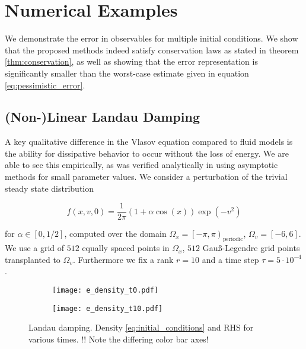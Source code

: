 
\section{Numerical Examples}

We demonstrate the error in observables for multiple initial conditions. We show that 
the proposed methods indeed satisfy conservation laws as stated in theorem 
\ref{thm:conservation}, as well as showing that the error representation is significantly 
smaller than the worst-case estimate given in equation \ref{eq:pessimistic_error}. 

\subsection{(Non-)Linear Landau Damping}\label{sec:landau}

A key qualitative difference in the Vlasov equation compared to fluid models is the 
ability for dissipative behavior to occur without the loss of energy. We are able to 
see this empirically, as was verified analytically in \cite{landau} using asymptotic 
methods for small parameter values. We consider a perturbation of the trivial steady 
state distribution 

\begin{equation}
    f(x, v, 0) = \frac{1}{2 \pi}(1 + \alpha \cos (x)) \exp (-v^2)
\end{equation}

for $\alpha \in \left[ 0, 1/2 \right]$, computed over the domain 
$\Omega_x = \left[ -\pi, \pi \right)_{\text{periodic}}$, 
$\Omega_v = \left[ -6, 6 \right]$. We use a grid of $512$ equally spaced points in 
$\Omega_x$, $512$ Gauß-Legendre grid points transplanted to $\Omega_v$. Furthermore we 
fix a rank $r = 10$ and a time step $\tau = 5 \cdot 10^{-4}$. 

\begin{figure}
    \centering
    \begin{subfigure}{0.45\textwidth}
        \texttt{[image: e\_density\_t0.pdf]}
    \end{subfigure}
    \begin{subfigure}{0.45\textwidth}
        \texttt{[image: e\_density\_t10.pdf]}
    \end{subfigure}
    \caption{
        Landau damping. Density \ref{eq:initial_conditions} and RHS for various times. 
        !! Note the differing color bar axes!
    }\label{fig:density}
\end{figure}

